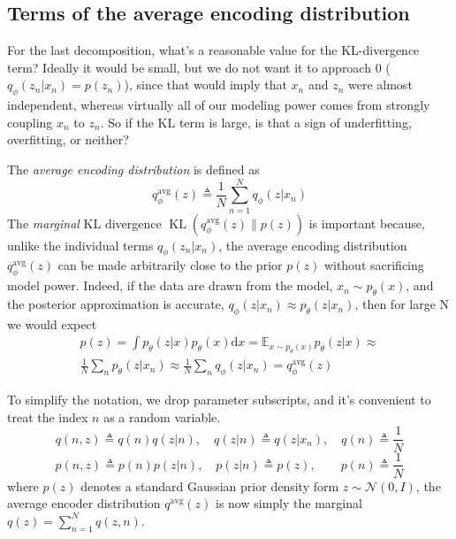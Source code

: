 \documentclass[5p,sort&compress]{elsarticle}
\begin{document}
\subsection{Terms of the average encoding distribution}

For the last decomposition, what's a reasonable value for the KL-divergence term? Ideally it would be small, but we do not want it to approach 0 ($q_{\phi}(z_n | x_n) = p(z_n)$), since that would imply that $x_n$ and $z_n$ were almost independent, whereas virtually all of our modeling power comes from strongly coupling $x_n$ to $z_n$. So if the KL term is large, is that a sign of underfitting, overfitting, or neither?

The \textit{average encoding distribution} is defined as
\begin{equation}
q_{\phi}^{\mathrm{avg}}(z) \triangleq \frac{1}{N} \sum_{n=1}^{N} q_{\phi}\left(z | x_{n}\right)
\end{equation}
The \textit{marginal} KL divergence $\operatorname{KL}(q_{\phi}^{\mathrm{avg}}(z) \| p(z))$ is important because, unlike the individual terms $q_{\phi}(z_n | x_n)$, the average encoding distribution $q_{\phi}^{\mathrm{avg}}(z)$ can be made arbitrarily close to the prior $p(z)$ without sacrificing model power. Indeed, if the data are drawn from the model, $x_n \sim p_{\theta}(x)$, and the posterior approximation is accurate, $q_{\phi}\left(z | x_{n}\right) \approx p_{\theta}\left(z | x_{n}\right)$, then for large N we would expect
\begin{equation}
\begin{aligned}
p(z)=\int p_{\theta}(z | x) p_{\theta}(x) \mathrm{d} x=\mathbb{E}_{x \sim p_{\theta}(x)} p_{\theta}(z | x) \approx \\ 
\frac{1}{N} \sum_{n} p_{\theta}\left(z | x_{n}\right) \approx \frac{1}{N} \sum_{n} q_{\phi}\left(z | x_{n}\right)=q_{\phi}^{\mathrm{avg}}(z)
\end{aligned}
\end{equation}

To simplify the notation, we drop parameter subscripts, and it's convenient to treat the index $n$ as a random variable.
\begin{equation}
q(n, z) \triangleq q(n) q(z | n), \quad q(z | n) \triangleq q\left(z | x_{n}\right), \quad q(n) \triangleq \frac{1}{N}
\end{equation}
\begin{equation}
p(n, z) \triangleq p(n) p(z | n), \quad p(z | n) \triangleq p(z), \quad \quad p(n) \triangleq \frac{1}{N}
\end{equation}
where $p(z)$ denotes a standard Gaussian prior density form $z \sim \mathcal{N}(0, I)$, the average encoder distribution $q^{\mathrm{avg}}(z)$ is now simply the marginal $q(z) = \sum_{n=1}^N q(z,n)$.
\end{document}
